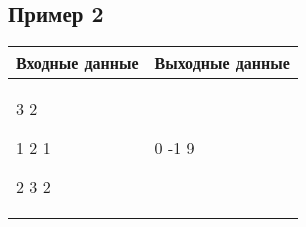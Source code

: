 \documentclass[a4]{article}
\begin{document}
\subsection*{Пример 2}
\label{sec:org2aeecb4}

\begin{table}[H]
\begin{center}
\begin{tabular}{|m{4cm}|m{4cm}|}
\hline
Входные данные & Выходные данные \\ \hline
3 2

1 2 1

2 3 2
&
0 -1 9 
\\ \hline
\end{tabular}
\end{center}
\end{table}

\pagebreak
\end{document}
